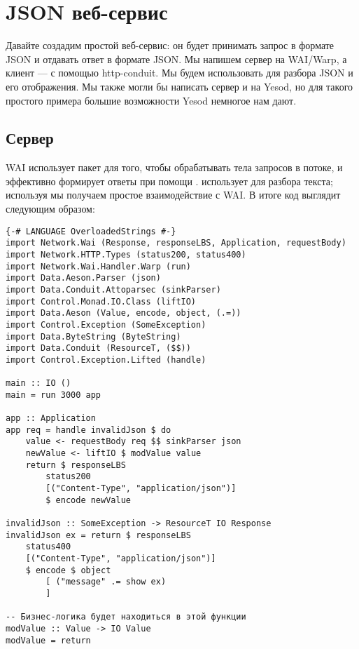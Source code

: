 \chapter {JSON веб-сервис}\label{chap:json_web_service}

Давайте создадим простой веб-сервис: он будет принимать запрос в формате JSON и отдавать ответ в формате JSON. Мы напишем сервер на WAI/Warp, а клиент --- с помощью {http-conduit}. Мы будем использовать  для разбора JSON и его отображения. Мы также могли бы написать сервер и на Yesod, но для такого простого примера большие возможности Yesod немногое нам дают.

\section {Сервер}

WAI использует пакет  для того, чтобы обрабатывать тела запросов в потоке, и эффективно формирует ответы при помощи .  использует  для разбора текста; используя  мы получаем простое взаимодействие с WAI. В итоге код выглядит следующим образом:

\begin{lstlisting}
{-# LANGUAGE OverloadedStrings #-}
import Network.Wai (Response, responseLBS, Application, requestBody)
import Network.HTTP.Types (status200, status400)
import Network.Wai.Handler.Warp (run)
import Data.Aeson.Parser (json)
import Data.Conduit.Attoparsec (sinkParser)
import Control.Monad.IO.Class (liftIO)
import Data.Aeson (Value, encode, object, (.=))
import Control.Exception (SomeException)
import Data.ByteString (ByteString)
import Data.Conduit (ResourceT, ($$))
import Control.Exception.Lifted (handle)

main :: IO ()
main = run 3000 app

app :: Application
app req = handle invalidJson $ do
    value <- requestBody req $$ sinkParser json
    newValue <- liftIO $ modValue value
    return $ responseLBS
        status200
        [("Content-Type", "application/json")]
        $ encode newValue

invalidJson :: SomeException -> ResourceT IO Response
invalidJson ex = return $ responseLBS
    status400
    [("Content-Type", "application/json")]
    $ encode $ object
        [ ("message" .= show ex)
        ]

-- Бизнес-логика будет находиться в этой функции
modValue :: Value -> IO Value
modValue = return
\end{lstlisting}%

